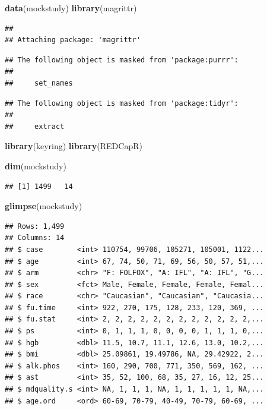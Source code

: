 \documentclass[
]{book}
\newenvironment{Shaded}{\begin{snugshade}}{\end{snugshade}}
\newcommand{\KeywordTok}[1]{\textcolor[rgb]{0.13,0.29,0.53}{\textbf{#1}}}
\newcommand{\NormalTok}[1]{#1}
\begin{document}
\begin{Shaded}
\begin{Highlighting}[]
\KeywordTok{data}\NormalTok{(mockstudy)}
\KeywordTok{library}\NormalTok{(magrittr)}
\end{Highlighting}
\end{Shaded}

\begin{verbatim}
## 
## Attaching package: 'magrittr'
\end{verbatim}

\begin{verbatim}
## The following object is masked from 'package:purrr':
## 
##     set_names
\end{verbatim}

\begin{verbatim}
## The following object is masked from 'package:tidyr':
## 
##     extract
\end{verbatim}

\begin{Shaded}
\begin{Highlighting}[]
\KeywordTok{library}\NormalTok{(keyring)}
\KeywordTok{library}\NormalTok{(REDCapR)}
\end{Highlighting}
\end{Shaded}

\begin{Shaded}
\begin{Highlighting}[]
\KeywordTok{dim}\NormalTok{(mockstudy)}
\end{Highlighting}
\end{Shaded}

\begin{verbatim}
## [1] 1499   14
\end{verbatim}

\begin{Shaded}
\begin{Highlighting}[]
\KeywordTok{glimpse}\NormalTok{(mockstudy)}
\end{Highlighting}
\end{Shaded}

\begin{verbatim}
## Rows: 1,499
## Columns: 14
## $ case        <int> 110754, 99706, 105271, 105001, 1122...
## $ age         <int> 67, 74, 50, 71, 69, 56, 50, 57, 51,...
## $ arm         <chr> "F: FOLFOX", "A: IFL", "A: IFL", "G...
## $ sex         <fct> Male, Female, Female, Female, Femal...
## $ race        <chr> "Caucasian", "Caucasian", "Caucasia...
## $ fu.time     <int> 922, 270, 175, 128, 233, 120, 369, ...
## $ fu.stat     <int> 2, 2, 2, 2, 2, 2, 2, 2, 2, 2, 2, 2,...
## $ ps          <int> 0, 1, 1, 1, 0, 0, 0, 0, 1, 1, 1, 0,...
## $ hgb         <dbl> 11.5, 10.7, 11.1, 12.6, 13.0, 10.2,...
## $ bmi         <dbl> 25.09861, 19.49786, NA, 29.42922, 2...
## $ alk.phos    <int> 160, 290, 700, 771, 350, 569, 162, ...
## $ ast         <int> 35, 52, 100, 68, 35, 27, 16, 12, 25...
## $ mdquality.s <int> NA, 1, 1, 1, NA, 1, 1, 1, 1, 1, NA,...
## $ age.ord     <ord> 60-69, 70-79, 40-49, 70-79, 60-69, ...
\end{verbatim}
\end{document}
